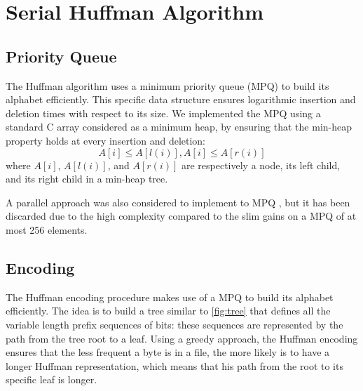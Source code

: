 \section{Serial Huffman Algorithm}
\subsection{Priority Queue}
The Huffman algorithm uses a minimum priority queue (MPQ) to build its alphabet efficiently. This specific data structure ensures logarithmic insertion and deletion times with respect to its size.
We implemented the MPQ using a standard C array considered as a minimum heap, by ensuring that the min-heap property holds at every insertion and deletion:
\begin{equation}
    A[i] \le A[l(i)], A[i] \le A[r(i)]
\end{equation}
where \(A[i]\), \(A[l(i)]\), and \(A[r(i)]\) are respectively a node, its left child, and its right child in a min-heap tree.

A parallel approach was also considered to implement to MPQ \cite{BRODAL19984}, but it has been discarded due to the high complexity compared to the slim gains on a MPQ of at most 256 elements.

\subsection{Encoding}
The Huffman encoding procedure makes use of a MPQ to build its alphabet efficiently. The idea is to build a tree similar to \cref{fig:tree} that defines all the variable length prefix sequences of bits: these sequences are represented by the path from the tree root to a leaf. Using a greedy approach, the Huffman encoding ensures that the less frequent a byte is in a file, the more likely is to have a longer Huffman representation, which means that his path from the root to its specific leaf is longer.

